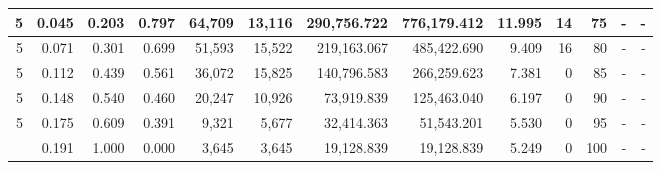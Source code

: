 \documentclass[fontsize=11pt]{article}
\begin{document}
\begin{landscape}
\begin{table}[]
\begin{tabular}{lrrrrrrrrrr|r|r|}
\multicolumn{1}{|r|}{5} & \multicolumn{1}{r|}{0.045} & \multicolumn{1}{r|}{0.203} & \multicolumn{1}{r|}{0.797} & \multicolumn{1}{r|}{64,709}  & \multicolumn{1}{r|}{13,116} & \multicolumn{1}{r|}{290,756.722} & \multicolumn{1}{r|}{776,179.412}   & \multicolumn{1}{r|}{11.995} & \multicolumn{1}{r|}{14}    & 75                     & -                                        & -                                   \\ \hline
\multicolumn{1}{|r|}{5} & \multicolumn{1}{r|}{0.071} & \multicolumn{1}{r|}{0.301} & \multicolumn{1}{r|}{0.699} & \multicolumn{1}{r|}{51,593}  & \multicolumn{1}{r|}{15,522} & \multicolumn{1}{r|}{219,163.067} & \multicolumn{1}{r|}{485,422.690}   & \multicolumn{1}{r|}{9.409}  & \multicolumn{1}{r|}{16}    & 80                     & -                                        & -                                   \\ \hline
\multicolumn{1}{|r|}{5} & \multicolumn{1}{r|}{0.112} & \multicolumn{1}{r|}{0.439} & \multicolumn{1}{r|}{0.561} & \multicolumn{1}{r|}{36,072}  & \multicolumn{1}{r|}{15,825} & \multicolumn{1}{r|}{140,796.583} & \multicolumn{1}{r|}{266,259.623}   & \multicolumn{1}{r|}{7.381}  & \multicolumn{1}{r|}{0}     & 85                     & -                                        & -                                   \\ \hline
\multicolumn{1}{|r|}{5} & \multicolumn{1}{r|}{0.148} & \multicolumn{1}{r|}{0.540} & \multicolumn{1}{r|}{0.460} & \multicolumn{1}{r|}{20,247}  & \multicolumn{1}{r|}{10,926} & \multicolumn{1}{r|}{73,919.839}  & \multicolumn{1}{r|}{125,463.040}   & \multicolumn{1}{r|}{6.197}  & \multicolumn{1}{r|}{0}     & 90                     & -                                        & -                                   \\ \hline
\multicolumn{1}{|r|}{5} & \multicolumn{1}{r|}{0.175} & \multicolumn{1}{r|}{0.609} & \multicolumn{1}{r|}{0.391} & \multicolumn{1}{r|}{9,321}   & \multicolumn{1}{r|}{5,677}  & \multicolumn{1}{r|}{32,414.363}  & \multicolumn{1}{r|}{51,543.201}    & \multicolumn{1}{r|}{5.530}  & \multicolumn{1}{r|}{0}     & 95                     & -                                        & -                                   \\ \hline
\multicolumn{1}{|r|}{}  & \multicolumn{1}{r|}{0.191} & \multicolumn{1}{r|}{1.000} & \multicolumn{1}{r|}{0.000} & \multicolumn{1}{r|}{3,645}   & \multicolumn{1}{r|}{3,645}  & \multicolumn{1}{r|}{19,128.839}  & \multicolumn{1}{r|}{19,128.839}    & \multicolumn{1}{r|}{5.249}  & \multicolumn{1}{r|}{0}     & 100                    & -                                        & -                                   \\ \hline

\end{tabular}
\end{table}
\end{landscape}
\end{document}
